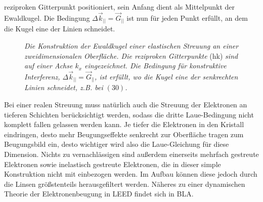 reziproken Gitterpunkt positioniert, sein Anfang dient als Mittelpunkt der Ewaldkugel. Die
Bedingung $\Delta \vec{k}_{||}=\vec{G}_{||}$ ist nun für jeden Punkt erfüllt, an dem die Kugel eine
der Linien schneidet. 
\begin{figure}[H]
\centering

\caption{\textit{Die Konstruktion der Ewaldkugel einer elastischen Streuung an einer
zweidimensionalen Oberfläche. Die reziproken Gitterpunkte} (hk) \textit{sind auf einer Achse $k_x$
eingezeichnet. Die Bedingung für konstruktive Interferenz, $\Delta \vec{k}_{||}=\vec{G}_{||}$,  ist erfüllt, wo die Kugel eine der senkrechten Linien
schneidet, z.B. bei $(30)$. }}
\label{ewald}
\end{figure}

Bei einer realen Streuung muss natürlich auch die Streuung der Elektronen an tieferen
Schichten berücksichtigt werden, sodass die dritte Laue-Bedingung nicht komplett fallen gelassen werden
kann. Je tiefer die Elektronen in den Kristall eindringen, desto mehr Beugungseffekte senkrecht zur
Oberfläche tragen zum Beugungsbild ein, desto wichtiger wird also die Laue-Gleichung für diese
Dimension. Nichts zu vernachlässigen sind außerdem einerseits mehrfach gestreute Elektronen sowie
inelastisch gestreute Elektronen, die in dieser simple Konstruktion nicht mit einbezogen werden. Im Aufbau
können diese jedoch durch die Linsen größstenteils herausgefiltert werden. Näheres zu einer dynamischen
Theorie der Elektronenbeugung in LEED findet sich in BLA.

\FloatBarrier










